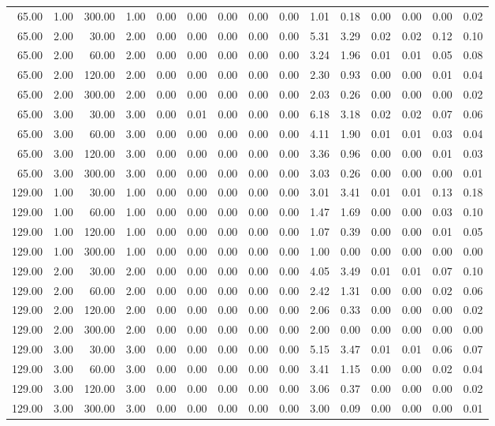 \begin{table}[ht]
\begin{tabular}{rrrrrrrrrrrrrrr}
  65.00 & 1.00 & 300.00 & 1.00 & 0.00 & 0.00 & 0.00 & 0.00 & 0.00 & 1.01 & 0.18 & 0.00 & 0.00 & 0.00 & 0.02 \\ 
  65.00 & 2.00 & 30.00 & 2.00 & 0.00 & 0.00 & 0.00 & 0.00 & 0.00 & 5.31 & 3.29 & 0.02 & 0.02 & 0.12 & 0.10 \\ 
  65.00 & 2.00 & 60.00 & 2.00 & 0.00 & 0.00 & 0.00 & 0.00 & 0.00 & 3.24 & 1.96 & 0.01 & 0.01 & 0.05 & 0.08 \\ 
  65.00 & 2.00 & 120.00 & 2.00 & 0.00 & 0.00 & 0.00 & 0.00 & 0.00 & 2.30 & 0.93 & 0.00 & 0.00 & 0.01 & 0.04 \\ 
  65.00 & 2.00 & 300.00 & 2.00 & 0.00 & 0.00 & 0.00 & 0.00 & 0.00 & 2.03 & 0.26 & 0.00 & 0.00 & 0.00 & 0.02 \\ 
  65.00 & 3.00 & 30.00 & 3.00 & 0.00 & 0.01 & 0.00 & 0.00 & 0.00 & 6.18 & 3.18 & 0.02 & 0.02 & 0.07 & 0.06 \\ 
  65.00 & 3.00 & 60.00 & 3.00 & 0.00 & 0.00 & 0.00 & 0.00 & 0.00 & 4.11 & 1.90 & 0.01 & 0.01 & 0.03 & 0.04 \\ 
  65.00 & 3.00 & 120.00 & 3.00 & 0.00 & 0.00 & 0.00 & 0.00 & 0.00 & 3.36 & 0.96 & 0.00 & 0.00 & 0.01 & 0.03 \\ 
  65.00 & 3.00 & 300.00 & 3.00 & 0.00 & 0.00 & 0.00 & 0.00 & 0.00 & 3.03 & 0.26 & 0.00 & 0.00 & 0.00 & 0.01 \\ 
  129.00 & 1.00 & 30.00 & 1.00 & 0.00 & 0.00 & 0.00 & 0.00 & 0.00 & 3.01 & 3.41 & 0.01 & 0.01 & 0.13 & 0.18 \\ 
  129.00 & 1.00 & 60.00 & 1.00 & 0.00 & 0.00 & 0.00 & 0.00 & 0.00 & 1.47 & 1.69 & 0.00 & 0.00 & 0.03 & 0.10 \\ 
  129.00 & 1.00 & 120.00 & 1.00 & 0.00 & 0.00 & 0.00 & 0.00 & 0.00 & 1.07 & 0.39 & 0.00 & 0.00 & 0.01 & 0.05 \\ 
  129.00 & 1.00 & 300.00 & 1.00 & 0.00 & 0.00 & 0.00 & 0.00 & 0.00 & 1.00 & 0.00 & 0.00 & 0.00 & 0.00 & 0.00 \\ 
  129.00 & 2.00 & 30.00 & 2.00 & 0.00 & 0.00 & 0.00 & 0.00 & 0.00 & 4.05 & 3.49 & 0.01 & 0.01 & 0.07 & 0.10 \\ 
  129.00 & 2.00 & 60.00 & 2.00 & 0.00 & 0.00 & 0.00 & 0.00 & 0.00 & 2.42 & 1.31 & 0.00 & 0.00 & 0.02 & 0.06 \\ 
  129.00 & 2.00 & 120.00 & 2.00 & 0.00 & 0.00 & 0.00 & 0.00 & 0.00 & 2.06 & 0.33 & 0.00 & 0.00 & 0.00 & 0.02 \\ 
  129.00 & 2.00 & 300.00 & 2.00 & 0.00 & 0.00 & 0.00 & 0.00 & 0.00 & 2.00 & 0.00 & 0.00 & 0.00 & 0.00 & 0.00 \\ 
  129.00 & 3.00 & 30.00 & 3.00 & 0.00 & 0.00 & 0.00 & 0.00 & 0.00 & 5.15 & 3.47 & 0.01 & 0.01 & 0.06 & 0.07 \\ 
  129.00 & 3.00 & 60.00 & 3.00 & 0.00 & 0.00 & 0.00 & 0.00 & 0.00 & 3.41 & 1.15 & 0.00 & 0.00 & 0.02 & 0.04 \\ 
  129.00 & 3.00 & 120.00 & 3.00 & 0.00 & 0.00 & 0.00 & 0.00 & 0.00 & 3.06 & 0.37 & 0.00 & 0.00 & 0.00 & 0.02 \\ 
  129.00 & 3.00 & 300.00 & 3.00 & 0.00 & 0.00 & 0.00 & 0.00 & 0.00 & 3.00 & 0.09 & 0.00 & 0.00 & 0.00 & 0.01 \\ 
   \hline
\end{tabular}
\end{table}
